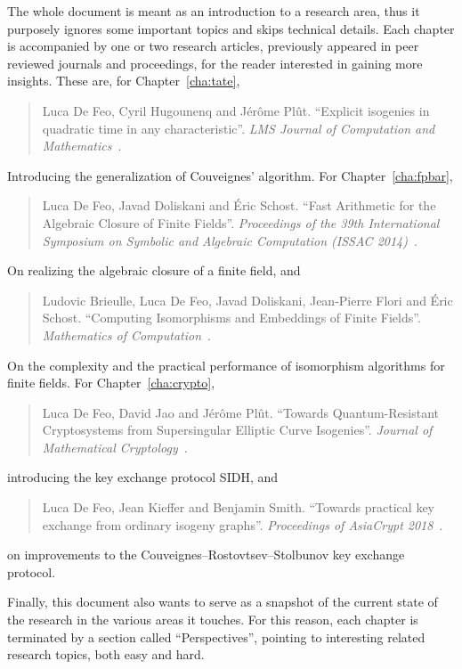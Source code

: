 \documentclass{report}
\theoremstyle{plain}
\theoremstyle{definition}
\begin{document}
The whole document is meant as an introduction to a research area,
thus it purposely ignores some important topics and skips technical
details. %
Each chapter is accompanied by one or two research articles,
previously appeared in peer reviewed journals and proceedings, for the
reader interested in gaining more insights. %
These are, for Chapter~\ref{cha:tate},
\begin{quote}
  Luca De Feo, Cyril Hugounenq and Jérôme Plût. %
  ``Explicit isogenies in quadratic time in any characteristic''. %
  \emph{LMS Journal of Computation and
    Mathematics}~\cite{defeo2016explicit}.
\end{quote}
Introducing the generalization of Couveignes' algorithm. %
For Chapter~\ref{cha:fpbar},
\begin{quote}
  Luca De Feo, Javad Doliskani and Éric Schost. %
  ``Fast Arithmetic for the Algebraic Closure of Finite Fields''. %
  \emph{Proceedings of the 39th International Symposium on Symbolic
    and Algebraic Computation (ISSAC 2014)}~\cite{DeDoSc2014}.
\end{quote}
On realizing the algebraic closure of a finite field, and
\begin{quote}
  Ludovic Brieulle, Luca De Feo, Javad Doliskani, Jean-Pierre Flori
  and Éric Schost. %
  ``Computing Isomorphisms and Embeddings of Finite Fields''. %
  \emph{Mathematics of Computation}~\cite{brieulle2018computing}.
\end{quote}
On the complexity and the practical performance of isomorphism
algorithms for finite fields. %
For Chapter~\ref{cha:crypto},
\begin{quote}
  Luca De Feo, David Jao and Jérôme Plût. %
  ``Towards Quantum-Resistant Cryptosystems from Supersingular
  Elliptic Curve Isogenies''. %
  \emph{Journal of Mathematical Cryptology}~\cite{defeo+jao+plut12}.
\end{quote}
introducing the key exchange protocol SIDH, and
\begin{quote}
  Luca De Feo, Jean Kieffer and Benjamin Smith. %
  ``Towards practical key exchange from ordinary isogeny graphs''. %
  \emph{Proceedings of AsiaCrypt 2018}~\cite{cryptoeprint:2018:485}.
\end{quote}
on improvements to the Couveignes--Rostovtsev--Stolbunov key exchange
protocol. %

Finally, this document also wants to serve as a snapshot of the
current state of the research in the various areas it touches. %
For this reason, each chapter is terminated by a section called
``Perspectives'', pointing to interesting related research topics,
both easy and hard.
\end{document}
